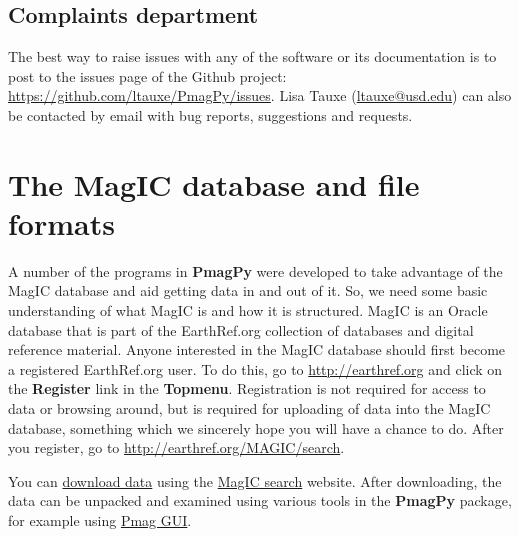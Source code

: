 \documentclass[11pt]{book}
\begin{document}
{%
\section{Complaints department}

The best way to raise issues with any of the software or its documentation is to post to the issues page of the Github project: \url{https://github.com/ltauxe/PmagPy/issues}. Lisa Tauxe (\href{mailto:ltauxe@ucsd.edu}{ltauxe@usd.edu}) can also be contacted by email with bug reports, suggestions and requests.

\chapter{The MagIC database and file formats}

A number of the programs in {\bf PmagPy} were  developed to take advantage of the MagIC database and aid getting data in and out of it.   So, we need some basic understanding of what MagIC is and how it is structured.
MagIC  is an Oracle  database that is part of the EarthRef.org collection of databases and digital reference material.
Anyone interested in the MagIC database should first become a registered EarthRef.org user.  To do this, go to \url{http://earthref.org} and click on the {\bf Register} link in the {\bf Topmenu}.   Registration is not required for access to data or browsing around, but is required for uploading of data into the MagIC database, something which we sincerely hope you will have a chance to do.
After you register, go to \url{http://earthref.org/MAGIC/search}.


You can \href{#magic_download}{download data} using the \href{http://earthref.org/MAGIC/search}{MagIC search} website.
%
%
%
       After downloading, the data can be unpacked and examined using various tools in the {\bf PmagPy}  package, for example using \href{#pmag_gui.py}{Pmag GUI}.

}
\end{document}
